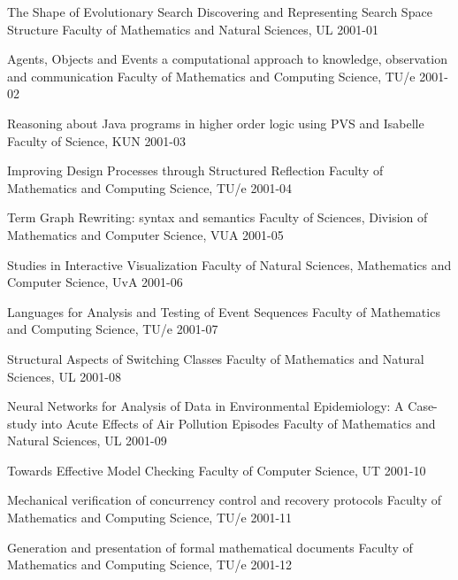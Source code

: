 \begin{multicols}{2}
         {The Shape of Evolutionary Search Discovering and 
Representing           Search Space Structure}
         {Faculty of Mathematics and Natural Sciences, UL}
         {2001-01}

         {Agents, Objects and Events
          a computational approach to knowledge, observation and      
             communication}
         {Faculty of Mathematics and Computing Science, TU/e}
         {2001-02}

           {Reasoning about Java programs in higher order logic using PVS 
          and Isabelle}
           {Faculty of Science, KUN}
           {2001-03}

         {Improving Design Processes through Structured Reflection}
         {Faculty of Mathematics and Computing Science, TU/e}
         {2001-04}

         {Term Graph Rewriting: syntax and semantics}
         {Faculty of Sciences, Division of Mathematics and Computer Science,
        VUA}
         {2001-05}

         {Studies in Interactive Visualization}
         {Faculty of Natural Sciences, Mathematics and Computer
          Science, UvA}
         {2001-06}

         {Languages for Analysis and Testing of Event Sequences}
         {Faculty of Mathematics and Computing Science, TU/e}
         {2001-07}

         {Structural Aspects of Switching Classes}
         {Faculty of Mathematics and Natural Sciences, UL}
         {2001-08}

         {Neural Networks for Analysis of Data in Environmental
Epidemiology: A Case-study into Acute Effects of Air Pollution Episodes}
         {Faculty of Mathematics and Natural Sciences, UL}
         {2001-09}

         {Towards Effective Model Checking}
         {Faculty of Computer Science, UT}
         {2001-10}

         {Mechanical verification of concurrency control and recovery           protocols}
         {Faculty of Mathematics and Computing Science, TU/e}
         {2001-11}

         {Generation and presentation of formal mathematical documents}
         {Faculty of Mathematics and Computing Science, TU/e}
         {2001-12}


\end{multicols}
